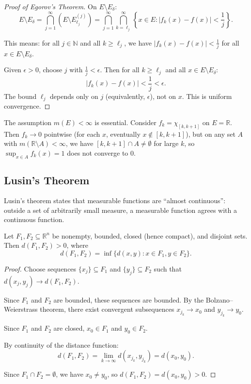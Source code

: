 \documentclass[11pt]{report}
\begin{document}
\begin{proof}[Proof of Egorov's Theorem]
On $E \setminus E_\delta$:
\[
E \setminus E_\delta = \bigcap_{j=1}^{\infty} (E \setminus E_{\ell_j}^{(j)}) = \bigcap_{j=1}^{\infty} \bigcap_{k=\ell_j}^{\infty} \left\{ x \in E : |f_k(x) - f(x)| < \frac{1}{j} \right\}.
\]

This means: for all $j \in \mathbb{N}$ and all $k \geq \ell_j$, we have $|f_k(x) - f(x)| < \frac{1}{j}$ for all $x \in E \setminus E_\delta$.

Given $\epsilon > 0$, choose $j$ with $\frac{1}{j} < \epsilon$. Then for all $k \geq \ell_j$ and all $x \in E \setminus E_\delta$:
\[
|f_k(x) - f(x)| < \frac{1}{j} < \epsilon.
\]
The bound $\ell_j$ depends only on $j$ (equivalently, $\epsilon$), not on $x$. This is uniform convergence.
\end{proof}

\begin{rembox}
The assumption $m(E) < \infty$ is essential. Consider $f_k = \chi_{[k, k+1]}$ on $E = \mathbb{R}$. Then $f_k \to 0$ pointwise (for each $x$, eventually $x \notin [k, k+1]$), but on any set $A$ with $m(\mathbb{R} \setminus A) < \infty$, we have $[k, k+1] \cap A \neq \emptyset$ for large $k$, so $\sup_{x \in A} f_k(x) = 1$ does not converge to $0$.
\end{rembox}

\subsection{Lusin's Theorem}

Lusin's theorem states that measurable functions are ``almost continuous'': outside a set of arbitrarily small measure, a measurable function agrees with a continuous function.

\begin{lembox}
\label{lem:compact-distance}
Let $F_1, F_2 \subseteq \mathbb{R}^n$ be nonempty, bounded, closed (hence compact), and disjoint sets. Then $d(F_1, F_2) > 0$, where
\[
d(F_1, F_2) = \inf\{d(x, y) : x \in F_1, y \in F_2\}.
\]
\end{lembox}

\begin{proof}
Choose sequences $\{x_j\} \subseteq F_1$ and $\{y_j\} \subseteq F_2$ such that $d(x_j, y_j) \to d(F_1, F_2)$.

Since $F_1$ and $F_2$ are bounded, these sequences are bounded. By the Bolzano--Weierstrass theorem, there exist convergent subsequences $x_{j_k} \to x_0$ and $y_{j_k} \to y_0$.

Since $F_1$ and $F_2$ are closed, $x_0 \in F_1$ and $y_0 \in F_2$.

By continuity of the distance function:
\[
d(F_1, F_2) = \lim_{k \to \infty} d(x_{j_k}, y_{j_k}) = d(x_0, y_0).
\]

Since $F_1 \cap F_2 = \emptyset$, we have $x_0 \neq y_0$, so $d(F_1, F_2) = d(x_0, y_0) > 0$.
\end{proof}
\end{document}
